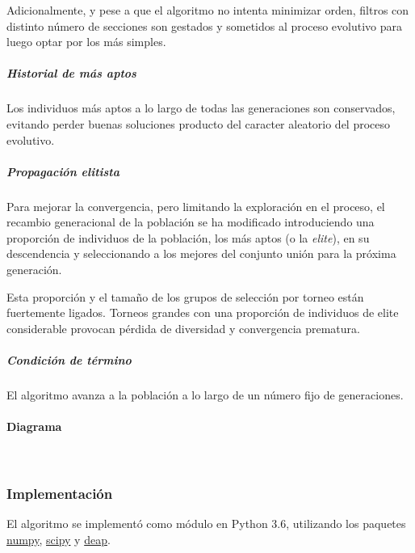 \documentclass[11pt]{article}
\begin{document}
Adicionalmente, y pese a que el algoritmo no intenta minimizar orden,
filtros con distinto número de secciones son gestados y sometidos al
proceso evolutivo para luego optar por los más simples.

\subparagraph{Historial de más aptos}\label{historial-de-muxe1s-aptos}

Los individuos más aptos a lo largo de todas las generaciones son
conservados, evitando perder buenas soluciones producto del caracter
aleatorio del proceso evolutivo.

\subparagraph{Propagación elitista}\label{propagaciuxf3n-elitista}

Para mejorar la convergencia, pero limitando la exploración en el
proceso, el recambio generacional de la población se ha modificado
introduciendo una proporción de individuos de la población, los más
aptos (o la \emph{elite}), en su descendencia y seleccionando a los
mejores del conjunto unión para la próxima generación.

Esta proporción y el tamaño de los grupos de selección por torneo están
fuertemente ligados. Torneos grandes con una proporción de individuos de
elite considerable provocan pérdida de diversidad y convergencia
prematura.

\subparagraph{Condición de término}\label{condiciuxf3n-de-tuxe9rmino}

El algoritmo avanza a la población a lo largo de un número fijo de
generaciones.

\pagebreak

\paragraph{Diagrama}\label{diagrama}

    
    \begin{center}
    \end{center}
    { \hspace*{\fill} \\}
    

    \subsubsection{Implementación}\label{implementaciuxf3n}

El algoritmo se implementó como módulo en Python 3.6, utilizando los
paquetes \href{https://www.numpy.org/}{numpy},
\href{https://scipy.org/}{scipy} y
\href{https://deap.readthedocs.io/en/master/}{deap}.
\end{document}
